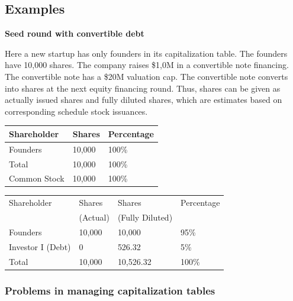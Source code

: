 \subsection{Examples}

\textbf{Seed round with convertible debt}

\vskip1cm

Here a new startup has only founders in its capitalization table. The founders have 10,000 shares. The company raises \$1,0M in a convertible note financing. The convertible note has a \$20M valuation cap. The convertible note converts into shares at the next equity financing round. Thus, shares can be given as actually issued shares and fully diluted shares, which are estimates based on corresponding schedule stock issuances.

\vskip1cm

\begin{center}
	\begin{tabular}{|p{3cm}|p{3cm}|p{3cm}|}
		\hline
		Shareholder  & Shares & Percentage \\
		\hline
		Founders     & 10,000 & 100\%      \\
		\hline
		Total        & 10,000 & 100\%      \\
		\hline
		Common Stock & 10,000 & 100\%      \\
		\hline
	\end{tabular}
	
\end{center}

\vskip1cm

\begin{center}
	\begin{tabular}{|p{3cm}|p{3cm}|p{3cm}|p{3cm}|}
		\hline
		Shareholder       & Shares   & Shares          & Percentage \\
		                  & (Actual) & (Fully Diluted) &            \\
		\hline
		Founders          & 10,000   & 10,000          & 95\%       \\
		\hline
		Investor I (Debt) & 0        & 526.32          & 5\%        \\
		\hline
		Total             & 10,000   & 10,526.32       & 100\%      \\
		\hline
	\end{tabular}
\end{center}

\subsubsection{Problems in managing capitalization tables}

